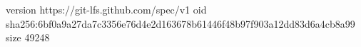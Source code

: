 version https://git-lfs.github.com/spec/v1
oid sha256:6bf0a9a27da7c3356e76d4e2d163678b61446f48b97f903a12dd83d6a4cb8a99
size 49248
